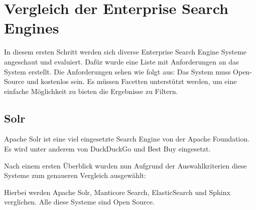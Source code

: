 \chapter{Vergleich der Enterprise Search Engines}

In diesem ersten Schritt werden sich diverse Enterprise Search Engine Systeme angeschaut und evaluiert. Dafür wurde eine Liste mit Anforderungen an das System erstellt. Die Anforderungen sehen wie folgt aus:
Das System muss Open-Source und kostenlos sein. Es müssen Facetten unterstützt werden, um eine einfache Möglichkeit zu bieten die Ergebnisse zu Filtern.

\section{Solr}

Apache Solr ist eine viel eingesetzte Search Engine von der Apache Foundation. Es wird unter anderem von DuckDuckGo und Best Buy eingesetzt. \cite{TheApacheSoftwareFoundation.2019}



Nach einem ersten Überblick wurden nun Aufgrund der Auswahlkriterien diese Systeme zum genaueren Vergleich ausgewählt:




Hierbei werden Apache Solr, Manticore Search, ElasticSearch und Sphinx verglichen. Alle diese Systeme sind Open Source. 

